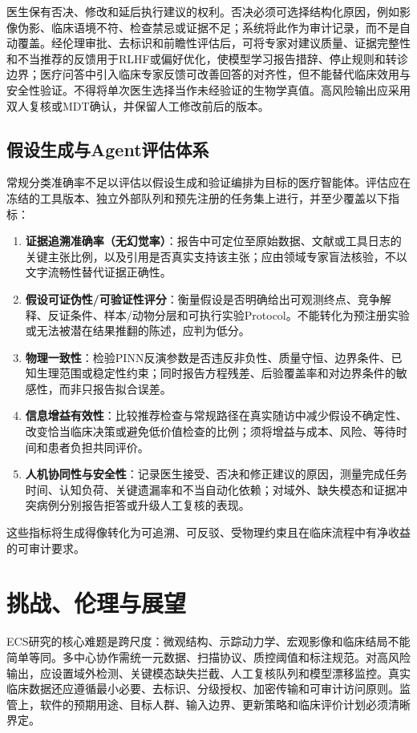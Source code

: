 ﻿\documentclass[11pt,a4paper]{article}
\begin{document}
医生保有否决、修改和延后执行建议的权利。否决必须可选择结构化原因，例如影像伪影、临床语境不符、检查禁忌或证据不足；系统将此作为审计记录，而不是自动覆盖。经伦理审批、去标识和前瞻性评估后，可将专家对建议质量、证据完整性和不当推荐的反馈用于RLHF或偏好优化，使模型学习报告措辞、停止规则和转诊边界；医疗问答中引入临床专家反馈可改善回答的对齐性，但不能替代临床效用与安全性验证\cite{singhal2023}。不得将单次医生选择当作未经验证的生物学真值。高风险输出应采用双人复核或MDT确认，并保留人工修改前后的版本。

\subsection{假设生成与Agent评估体系}
常规分类准确率不足以评估以假设生成和验证编排为目标的医疗智能体。评估应在冻结的工具版本、独立外部队列和预先注册的任务集上进行，并至少覆盖以下指标：
\begin{enumerate}
\item \textbf{证据追溯准确率（无幻觉率）}：报告中可定位至原始数据、文献或工具日志的关键主张比例，以及引用是否真实支持该主张；应由领域专家盲法核验，不以文字流畅性替代证据正确性。
\item \textbf{假设可证伪性/可验证性评分}：衡量假设是否明确给出可观测终点、竞争解释、反证条件、样本/动物分层和可执行实验Protocol。不能转化为预注册实验或无法被潜在结果推翻的陈述，应判为低分。
\item \textbf{物理一致性}：检验PINN反演参数是否违反非负性、质量守恒、边界条件、已知生理范围或稳定性约束；同时报告方程残差、后验覆盖率和对边界条件的敏感性，而非只报告拟合误差。
\item \textbf{信息增益有效性}：比较推荐检查与常规路径在真实随访中减少假设不确定性、改变恰当临床决策或避免低价值检查的比例；须将增益与成本、风险、等待时间和患者负担共同评价。
\item \textbf{人机协同性与安全性}：记录医生接受、否决和修正建议的原因，测量完成任务时间、认知负荷、关键遗漏率和不当自动化依赖；对域外、缺失模态和证据冲突病例分别报告拒答或升级人工复核的表现。
\end{enumerate}
这些指标将生成得像转化为可追溯、可反驳、受物理约束且在临床流程中有净收益的可审计要求。

\section{挑战、伦理与展望}
ECS研究的核心难题是跨尺度：微观结构、示踪动力学、宏观影像和临床结局不能简单等同。多中心协作需统一元数据、扫描协议、质控阈值和标注规范。对高风险输出，应设置域外检测、关键模态缺失拦截、人工复核队列和模型漂移监控。真实临床数据还应遵循最小必要、去标识、分级授权、加密传输和可审计访问原则。监管上，软件的预期用途、目标人群、输入边界、更新策略和临床评价计划必须清晰界定\cite{fdaaiml2021}。
\end{document}
